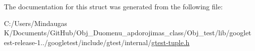 The documentation for this struct was generated from the following file\+:\begin{DoxyCompactItemize}
\item 
C\+:/\+Users/\+Mindaugas K/\+Documents/\+Git\+Hub/\+Obj\+\_\+\+Duomenu\+\_\+apdorojimas\+\_\+class/\+Obj\+\_\+test/lib/googletest-\/release-\/1../googletest/include/gtest/internal/\mbox{\hyperlink{gtest-tuple_8h}{gtest-\/tuple.\+h}}\end{DoxyCompactItemize}
